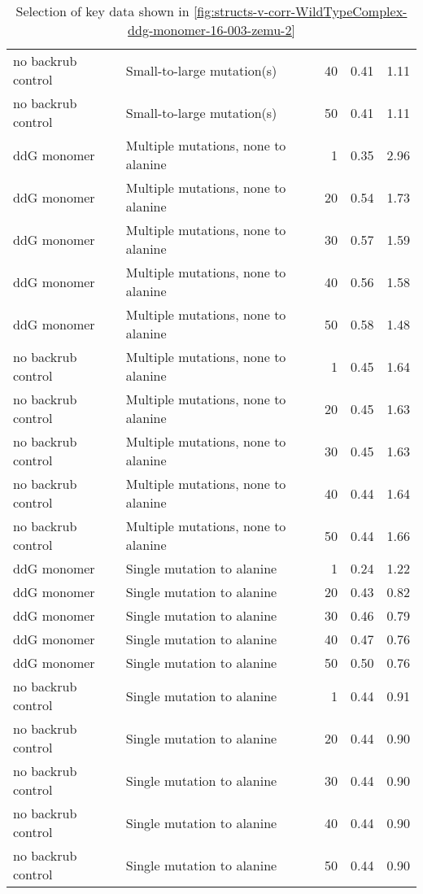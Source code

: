 \begin{table}
\begin{tabular}{llrrr}
 no backrub control &           Small-to-large mutation(s) &          40 & 0.41 & 1.11 \\
 no backrub control &           Small-to-large mutation(s) &          50 & 0.41 & 1.11 \\
        ddG monomer &  Multiple mutations, none to alanine &           1 & 0.35 & 2.96 \\
        ddG monomer &  Multiple mutations, none to alanine &          20 & 0.54 & 1.73 \\
        ddG monomer &  Multiple mutations, none to alanine &          30 & 0.57 & 1.59 \\
        ddG monomer &  Multiple mutations, none to alanine &          40 & 0.56 & 1.58 \\
        ddG monomer &  Multiple mutations, none to alanine &          50 & 0.58 & 1.48 \\
 no backrub control &  Multiple mutations, none to alanine &           1 & 0.45 & 1.64 \\
 no backrub control &  Multiple mutations, none to alanine &          20 & 0.45 & 1.63 \\
 no backrub control &  Multiple mutations, none to alanine &          30 & 0.45 & 1.63 \\
 no backrub control &  Multiple mutations, none to alanine &          40 & 0.44 & 1.64 \\
 no backrub control &  Multiple mutations, none to alanine &          50 & 0.44 & 1.66 \\
        ddG monomer &           Single mutation to alanine &           1 & 0.24 & 1.22 \\
        ddG monomer &           Single mutation to alanine &          20 & 0.43 & 0.82 \\
        ddG monomer &           Single mutation to alanine &          30 & 0.46 & 0.79 \\
        ddG monomer &           Single mutation to alanine &          40 & 0.47 & 0.76 \\
        ddG monomer &           Single mutation to alanine &          50 & 0.50 & 0.76 \\
 no backrub control &           Single mutation to alanine &           1 & 0.44 & 0.91 \\
 no backrub control &           Single mutation to alanine &          20 & 0.44 & 0.90 \\
 no backrub control &           Single mutation to alanine &          30 & 0.44 & 0.90 \\
 no backrub control &           Single mutation to alanine &          40 & 0.44 & 0.90 \\
 no backrub control &           Single mutation to alanine &          50 & 0.44 & 0.90 \\
\bottomrule
\end{tabular}

\caption[]{Selection of key data shown in \cref{fig:structs-v-corr-WildTypeComplex-ddg-monomer-16-003-zemu-2}}
\label{tab:structs-v-corr-WildTypeComplex-ddg-monomer-16-003-zemu-2-underlying-data}
\end{table}
